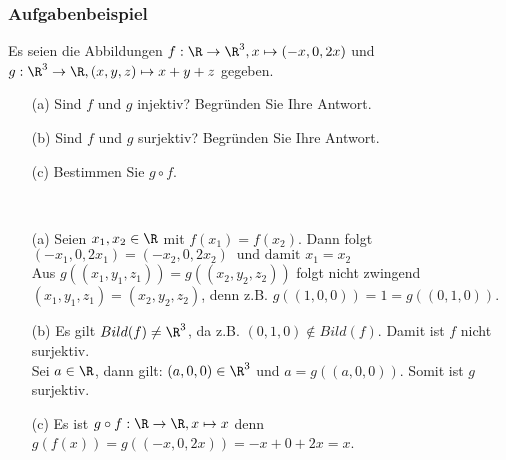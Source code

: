 \begin{frame}\frametitle{Aufgabenbeispiel}
Es seien die Abbildungen $f:\R \to \R^3, x \mapsto (-x, 0, 2x)$ und $g: \R^3 \to \R, (x,y,z) \mapsto x+y+z$ gegeben. 
\begin{itemize}
\item[(a)] Sind $f$ und $g$ injektiv? Begr\"unden Sie Ihre Antwort.
\item[(b)] Sind $f$ und $g$ surjektiv? Begr\"unden Sie Ihre Antwort.
\item[(c)] Bestimmen Sie $g \circ f$.
\end{itemize}\pause\vfill
{}\\
\begin{itemize}
\item[(a)]
 Seien $x_1, x_2 \in \R$ mit $f(x_1)=f(x_2)$. Dann folgt $(-x_1,0,2x_1)=(-x_2,0,2x_2) \ \text{ und damit }  x_1=x_2$ \\\pause
{} Aus $g((x_1,y_1,z_1))=g((x_2,y_2,z_2))$ folgt nicht zwingend $(x_1,y_1,z_1)=(x_2,y_2,z_2)$, denn z.B. $g((1,0,0))=1=g((0,1,0))$.\pause 
\item[(b)] 
 Es gilt $Bild(f) \ne \R^3$, da z.B. $(0,1,0) \notin Bild(f)$. Damit ist $f$ nicht surjektiv.\\\pause
{} Sei $a \in \R$, dann gilt: $(a,0,0) \in \R^3$ und $a=g((a,0,0))$. Somit ist $g$ surjektiv.\pause
\item[(c)]
Es ist
$ g\circ f : \R \to \R, x \mapsto x$
denn 
$g(f(x))=g((-x,0,2x))=-x+0+2x=x$.
\end{itemize}
\end{frame}
%
